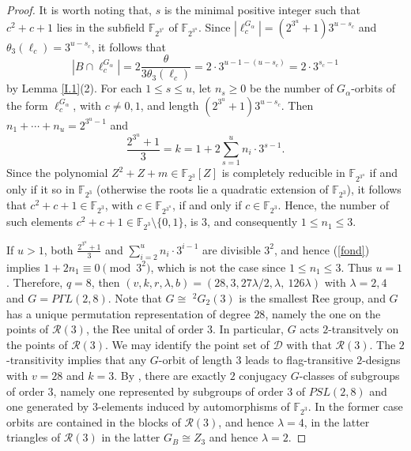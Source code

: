 \documentclass[a4paper,twopage,reqno,12pt]{amsart}
\theoremstyle{definition}
\numberwithin{equation}{section}
\renewcommand{\leq}{\leqslant}
\renewcommand{\geq}{\geqslant}
\begin{document}
\begin{proof}
It is worth noting that, $s$ is the minimal positive integer such that $c^2+c+1$ lies in the subfield $\mathbb{F}_{2^{3^s}}$ of $\mathbb{F}_{2^{3^u}}$. Since $\left\vert \ell_{c}^{G_{\alpha }}\right\vert=(2^{3^u}+1)3^{u-s_{c}}$ and $\theta _{3}(\ell_{c})=3^{u-s_{c}}$, it follows that $$\left\vert B\cap \ell_{c}^{G_{\alpha }}\right\vert =2\frac{\theta }{3\theta _{3}(\ell_{c})}=2 \cdot 3^{u-1-(u-s_{c})}=2 \cdot 3^{s_{c}-1}$$ by Lemma \ref{I.1}(2). For each $1\leq s \leq u$, let $n_{s}\geq 0$ be the number of $G_{\alpha}$-orbits of the form $\ell_{c}^{G_{\alpha }}$, with $c \neq 0,1$, and length $(2^{3^u}+1)3^{u-s_{c}}$. Then $n_{1}+\cdots + n_{u}=2^{3^{u}-1}$ and
\begin{equation}\label{fond}
\frac{2^{3^{u}}+1}{3}=k=1+2\sum_{s=1}^{u}n_{i}\cdot 3^{s-1}\text{.}    
\end{equation}
Since the polynomial $Z^{2}+Z+m \in \mathbb{F}_{2^{3}}[Z]$ is completely reducible in $\mathbb{F}_{2^{3^{u}}}$ if and only if it so in $\mathbb{F}_{2^{3}}$ (otherwise the roots lie a quadratic extension of $\mathbb{F}_{2^{3}}$), it follows that $c^{2}+c+1 \in \mathbb{F}_{2^{3}}$, with $c \in \mathbb{F}_{2^{3^{u}}}$, if and only if $c \in \mathbb{F}_{2^{3}}$. Hence, the number of such elements $c^{2}+c+1 \in \mathbb{F}_{2^{3}} \setminus \{0,1 \}$, is $3$, and consequently $1 \leq n_{1}\leq 3$. 

If $u>1$, both $\frac{2^{3^{u}}+1}{3}$ and $\sum_{i=2}^{u}n_{i}\cdot 3^{i-1}$ are divisible $3^{2}$, and hence (\ref{fond}) implies $1+2n_{1} \equiv 0 \pmod{3^{2}}$, which is not the case since $1 \leq n_{1}\leq 3$. Thus $u=1$. Therefore, $q=8$, then $(v,k,r,\lambda ,b)=(28,3,27\lambda /2,\lambda
,\ 126\lambda )$ with $\lambda =2,4$ and $G= P\Gamma
L(2,8)$. Note that $G\cong $ $%
^{2}G_{2}(3)$ is the smallest Ree group, and $G$ has a unique permutation
representation of degree $28$, namely the one on the points of $\mathcal{R}%
(3)$, the Ree unital of order $3$. In particular, $G$ acts $2$-transitvely
on the points of $\mathcal{R}(3)$. We may identify the point set of $%
\mathcal{D}$ with that $\mathcal{R}(3)$. The $2$-transitivity implies that
any $G$-orbit of length $3$ leads to flag-transitive $2$-designs with $v=28$
and $k=3$. By \cite{At}, there are exactly $2$ conjugacy $G$-classes of
subgroups of order $3$, namely one represented by subgroups of order $3$ of 
$PSL(2,8)$ and one generated by $3$-elements induced by automorphisms of $%
\mathbb{F}_{2^{3}}$.  In the former case orbits are contained in the blocks
of $\mathcal{R}(3)$, and hence $\lambda =4$, in the latter triangles of $\mathcal{R}(3)$ in the latter $%
G_{B}\cong Z_{3}$ and hence $\lambda =2$.
\end{proof}
\end{document}
